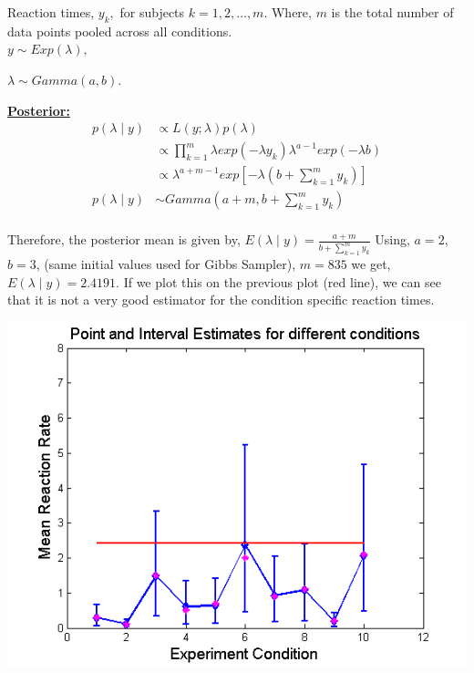 \documentclass{article}
\begin{document}
Reaction times, $y_k,$ for subjects $k = 1,2,\ldots,m.$ Where, $m$ is the total number of data points pooled across all conditions.\\

$y \sim Exp(\lambda),$

$\lambda \sim Gamma(a,b).$

\noindent \underline{\textbf{Posterior:}}\\

\begin{align*}
p(\lambda \mid y) &\propto L(y;\lambda)p(\lambda)\\
&\propto \prod_{k=1}^{m}{\lambda}exp(-\lambda y_k) \lambda^{a-1} exp(-\lambda b)\\
&\propto \lambda^{a+m-1}exp\left[-\lambda\left(b+\sum_{k=1}^{m}y_k\right)\right]\\
p(\lambda \mid y) &\sim Gamma\left(a+m,b+\sum_{k=1}^{m}y_k\right)\\
\end{align*}

Therefore, the posterior mean is given by, $E(\lambda \mid y) = \frac{a+m}{b+\sum_{k=1}^{m}y_k}$
Using, $a = 2$, $b = 3$, (same initial values used for Gibbs Sampler), $m = 835$ we get, $E(\lambda \mid y) = 2.4191.$ If we plot this on the previous plot (red line), we can see that it is not a very good estimator for the condition specific reaction times.\\

\begin{center}
\includegraphics[scale=0.75]{NonHierarchicalModel.png}\\
\end{center}

\pagebreak
{}\\

\end{document}
